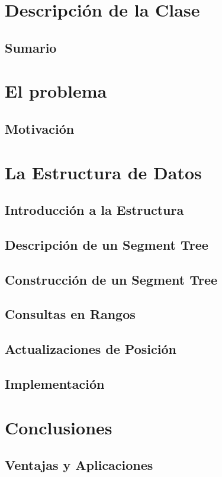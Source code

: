 \section{Descripci\'on de la Clase}
\subsection{Sumario}


\section{El problema}
\subsection{Motivaci\'on}


\section{La Estructura de Datos}
\subsection{Introducci\'on a la Estructura}

\subsection{Descripci\'on de un Segment Tree}

\subsection{Construcci\'on de un Segment Tree}

\subsection{Consultas en Rangos}

\subsection{Actualizaciones de Posici\'on}

\subsection{Implementaci\'on}


\section{Conclusiones}
\subsection{Ventajas y Aplicaciones}


